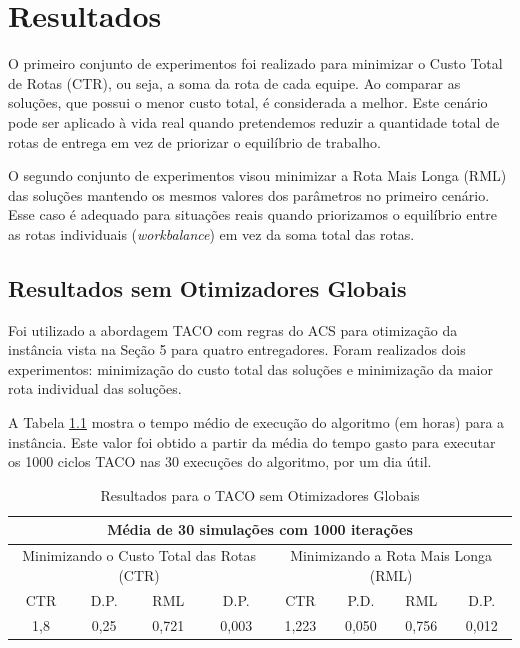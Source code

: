 \chapter{Resultados}


O primeiro conjunto de experimentos foi realizado para minimizar o Custo Total de Rotas (CTR), ou seja, a soma da rota de cada equipe. Ao comparar as soluções, que possui o menor custo total, é considerada a melhor. Este cenário pode ser aplicado à vida real quando pretendemos reduzir a quantidade total de rotas de entrega em vez de priorizar o equilíbrio de trabalho.

O segundo conjunto de experimentos visou minimizar a Rota Mais Longa (RML) das soluções mantendo os mesmos valores dos parâmetros no primeiro cenário. Esse caso é adequado para situações reais quando priorizamos o equilíbrio entre as rotas individuais (\textit{workbalance}) em vez da soma total das rotas.

\section{Resultados sem Otimizadores Globais}
\label{sec-resultados-taco}

Foi utilizado a abordagem TACO com regras do ACS para otimização da instância vista na Seção 5 para quatro entregadores. Foram realizados dois experimentos: minimização do custo total das soluções e minimização da maior rota individual das soluções.

A Tabela \ref{tab:resultado-taco} mostra o tempo médio de execução do algoritmo (em horas) para a instância. Este valor foi obtido a partir da média do tempo gasto para executar os 1000 ciclos TACO nas 30 execuções do algoritmo, por um dia útil.

\begin{table}[htb]
    \centering
    \caption{Resultados para o TACO sem Otimizadores Globais} \label{tab:resultado-taco}
\begin{tabular}{|c|c|c|c|c|c|c|c|}
\hline
\multicolumn{8}{|c|}{Média de 30 simulações com 1000 iterações}                                                            \\ \hline
\multicolumn{4}{|c|}{Minimizando o Custo Total das Rotas (CTR)} & \multicolumn{4}{c|}{Minimizando a Rota Mais Longa (RML)} \\ \hline
CTR           & D.P.          & RML            & D.P.           & CTR           & P.D.         & RML         & D.P.        \\ \hline
1,8           & 0,25          & 0,721          & 0,003          & 1,223         & 0,050        & 0,756       & 0,012       \\ \hline
\end{tabular}
\end{table}

